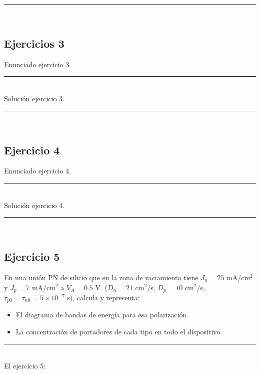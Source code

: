 \rule{\textwidth}{0.1pt} \\[2pt]

\subsection{Ejercicios 3}

Enunciado ejercicio 3.

\rule{\textwidth}{0.1pt} \\[2pt]

Solución ejercicio 3.


\rule{\textwidth}{0.1pt} \\[2pt]

\subsection{Ejercicio 4} 

Enunciado ejercicio 4.

\rule{\textwidth}{0.1pt} \\[2pt]

Solución ejercicio 4. 

\rule{\textwidth}{0.1pt} \\[2pt]

\subsection{Ejercicio 5} 

En una unión PN de silicio que en la zona de vaciamiento tiene $J_n = 25$ mA/cm$^2$ y 
$J_p = 7$ mA/cm$^2$ a $V_A = 0.5$ V. ($D_n = 21$ cm$^2$/s, $D_p = 10$ cm$^2$/s, 
$\tau_{p0} = \tau_{n0} = 5 \times 10^{-7}$ s), calcula y representa:

\begin{itemize}
    \item El diagrama de bandas de energía para esa polarización.
    \item La concentración de portadores de cada tipo en todo el dispositivo.
\end{itemize}


\rule{\textwidth}{0.1pt} \\[2pt]

El ejercicio 5:

